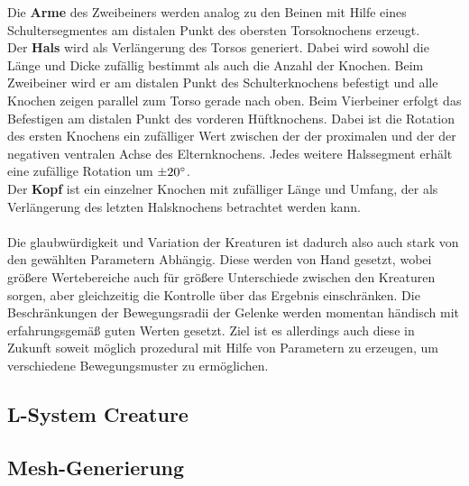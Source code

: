 Die \textbf{Arme} des Zweibeiners werden analog zu den Beinen mit Hilfe eines Schultersegmentes am distalen Punkt des obersten Torsoknochens erzeugt.\\
Der \textbf{Hals} wird als Verlängerung des Torsos generiert. Dabei wird sowohl die Länge und Dicke zufällig bestimmt als auch die Anzahl der Knochen. Beim Zweibeiner wird er am distalen Punkt des Schulterknochens befestigt und alle Knochen zeigen parallel zum Torso gerade nach oben. Beim Vierbeiner erfolgt das Befestigen am distalen Punkt des vorderen Hüftknochens. Dabei ist die Rotation des ersten Knochens ein zufälliger Wert zwischen der der proximalen und der der negativen ventralen Achse des Elternknochens. Jedes weitere Halssegment erhält eine zufällige Rotation um $\pm 20\degree$.\\
Der \textbf{Kopf} ist ein einzelner Knochen mit zufälliger Länge und Umfang, der als Verlängerung des letzten Halsknochens betrachtet werden kann.\\
\\
Die glaubwürdigkeit und Variation der Kreaturen ist dadurch also auch stark von den gewählten Parametern Abhängig. Diese werden von Hand gesetzt, wobei größere Wertebereiche auch für größere Unterschiede zwischen den Kreaturen sorgen, aber gleichzeitig die Kontrolle über das Ergebnis einschränken. Die Beschränkungen der Bewegungsradii der Gelenke werden momentan händisch mit erfahrungsgemäß guten Werten gesetzt. Ziel ist es allerdings auch diese in Zukunft soweit möglich prozedural mit Hilfe von Parametern zu erzeugen, um verschiedene Bewegungsmuster zu ermöglichen.




\subsection{L-System Creature}




\subsection{Mesh-Generierung}
